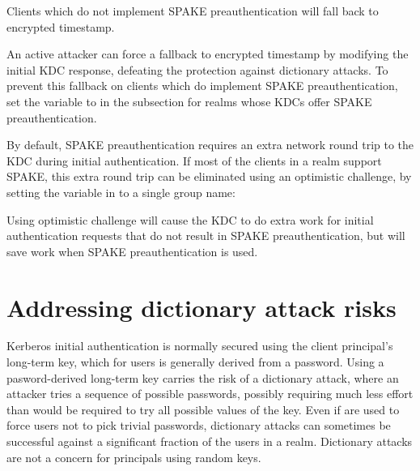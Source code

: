 \documentclass[letterpaper,10pt,english]{sphinxmanual}
\begin{document}
Clients which do not implement SPAKE preauthentication will fall back
to encrypted timestamp.

An active attacker can force a fallback to encrypted timestamp by
modifying the initial KDC response, defeating the protection against
dictionary attacks.  To prevent this fallback on clients which do
implement SPAKE preauthentication, set the
 variable to  in the
{\hyperref[\detokenize{admin/conf_files/krb5_conf:realms}]{}} subsection for realms whose KDCs offer SPAKE
preauthentication.

By default, SPAKE preauthentication requires an extra network round
trip to the KDC during initial authentication.  If most of the clients
in a realm support SPAKE, this extra round trip can be eliminated
using an optimistic challenge, by setting the
 variable in {\hyperref[\detokenize{admin/conf_files/kdc_conf:kdcdefaults}]{}} to a
single group name:

%
\begin{sphinxVerbatim}[commandchars=\\\{\}]
\PYG{p}{[}\PYG{p}{]}
      
\end{sphinxVerbatim}

Using optimistic challenge will cause the KDC to do extra work for
initial authentication requests that do not result in SPAKE
preauthentication, but will save work when SPAKE preauthentication is
used.


\chapter{Addressing dictionary attack risks}
\label{\detokenize{admin/dictionary:addressing-dictionary-attack-risks}}\label{\detokenize{admin/dictionary::doc}}\label{\detokenize{admin/dictionary:dictionary}}
Kerberos initial authentication is normally secured using the client
principal’s long-term key, which for users is generally derived from a
password.  Using a pasword-derived long-term key carries the risk of a
dictionary attack, where an attacker tries a sequence of possible
passwords, possibly requiring much less effort than would be required
to try all possible values of the key.  Even if {\hyperref[\detokenize{admin/database:policies}]{}} are used to force users not to pick trivial
passwords, dictionary attacks can sometimes be successful against a
significant fraction of the users in a realm.  Dictionary attacks are
not a concern for principals using random keys.
\end{document}
